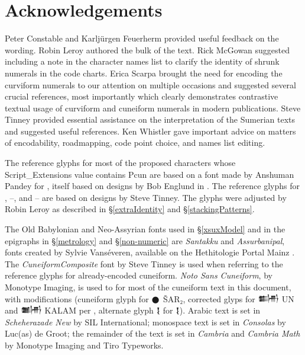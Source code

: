\documentclass[10pt, a4paper, twoside]{article}
\newcommand\oneEighthIkuC{{\proposalfont\symbol{"12587}}}
\newcommand\oneBurʾuC{{\proposalfont\symbol{"1258E}}}
\newcommand\fiveBurʾuC{{\proposalfont\symbol{"12592}}}
\newcommand\oneBanTwoC{{\proposalfont\symbol{"12593}}}
\newcommand\fiveBanTwoC{{\proposalfont\symbol{"12597}}}
\begin{document}
\section*{Acknowledgements}
Peter Constable and Karljürgen Feuerherm provided useful feedback on the wording.
Robin Leroy authored the bulk of the text.
Rick McGowan suggested including a note in the character names list to clarify the identity of shrunk numerals in the code charts.
Erica Scarpa brought the need for encoding the curviform numerals to our attention on multiple occasions and
suggested several crucial references, most importantly \cite{Gori2023} which clearly demonstrates contrastive textual
usage of curviform and cuneiform numerals in modern publications.
Steve Tinney provided essential assistance on the interpretation of the Sumerian texts and suggested useful references.
Ken Whistler gave important advice on matters of encodability, roadmapping, code point choice, and names list editing.

The reference glyphs for most of the proposed characters whose Script\_Extensions value contains Pcun are based on a font
made by Anshuman Pandey for \cite{L2/23-190}, itself based on designs by Bob Englund in \cite{archsigns}.
The reference glyphs for \oneEighthIkuC{}, \oneBurʾuC{}--\fiveBurʾuC{}, and \oneBanTwoC{}--\fiveBanTwoC{}
are based on designs by Steve Tinney.
The glyphs were adjusted by Robin Leroy as described in §\ref{extraIdentity} and §\ref{stackingPatterns}.

The Old Babylonian and Neo-Assyrian fonts used in §\ref{xsuxModel} and in the epigraphs in §\ref{metrology} and
§\ref{non-numeric}
are \emph{Santakku} and \emph{Assurbanipal},
fonts created by Sylvie Vanséveren,
available on the Hethitologie Portal Mainz \cite{Vanséveren2021}.
The \emph{CuneiformComposite} font by Steve Tinney is used when referring to the reference glyphs for already-encoded cuneiform.
\emph{Noto Sans Cuneiform}, by Monotype Imaging,
is used to for most of the cuneiform text in this document, with modifications (cuneiform glyph for {\xsuxfont 𒊹} ŠAR₂,
corrected glyps for {\xsuxfont 𒌦} UN and {\xsuxfont 𒌧} KALAM per \cite{Unicode16},
alternate glyph {\xsuxfont{} 𒋙} for {\xsuxfont 𒋙}).
Arabic text is set in \emph{Scheherazade New} by SIL International;
monospace text is set in \emph{Consolas} by Luc(as) de Groot;
the remainder of the text is set in \emph{Cambria} and \emph{Cambria Math} by Monotype Imaging and Tiro Typeworks.
\nocite{DCCLT}
\printbibheading[heading=bibintoc]
\printbibliography[heading=subbibintoc,title={Artefacts},type=artwork]
\printbibliography[heading=subbibintoc,title={ISO and Unicode documents},nottype=artwork,keyword=unicode]
\printbibliography[heading=subbibintoc,title={Online corpora and related projects},nottype=artwork,keyword=reference]
\printbibliography[heading=subbibintoc,title={Other documents},nottype=artwork,notkeyword=unicode,notkeyword=reference]

\end{document}
